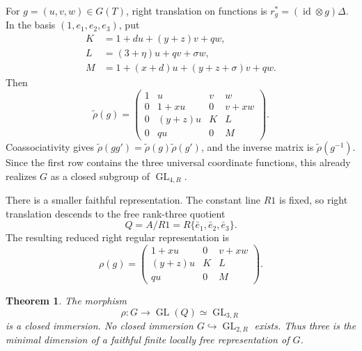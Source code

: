 \documentclass[11pt]{article}
\newtheorem{theorem}{Theorem}[section]
\theoremstyle{remark}
\newcommand{\GL}{\operatorname{GL}}
\newcommand{\id}{\operatorname{id}}
\begin{document}
For \(g=(u,v,w)\in G(T)\), right translation on functions is
\(r_g^*=(\id\otimes g)\Delta\).  In the basis
\((1,e_1,e_2,e_3)\), put
\begin{equation}\label{eq:KLM}
\begin{aligned}
 K&=1+du+(y+z)v+qw,\\
 L&=(3+\eta)u+qv+\sigma w,\\
 M&=1+(x+d)u+(y+z+\sigma)v+qw.
\end{aligned}
\end{equation}
Then
\begin{equation}\label{eq:GL4-matrix}
 \widetilde\rho(g)=
 \begin{pmatrix}
 1&u&v&w\\
 0&1+xu&0&v+xw\\
 0&(y+z)u&K&L\\
 0&qu&0&M
 \end{pmatrix}.
\end{equation}
Coassociativity gives
\(\widetilde\rho(gg')=\widetilde\rho(g)\widetilde\rho(g')\), and the
inverse matrix is \(\widetilde\rho(g^{-1})\).  Since the first row contains
the three universal coordinate functions, this already realizes \(G\) as a
closed subgroup of \(\GL_{4,R}\).

There is a smaller faithful representation.  The constant line \(R1\) is
fixed, so right translation descends to the free rank-three quotient
\begin{equation}\label{eq:reduced-regular}
 Q=A/R1=R\{\bar e_1,\bar e_2,\bar e_3\}.
\end{equation}
The resulting reduced right regular representation is
\begin{equation}\label{eq:GL3-matrix}
 \rho(g)=
 \begin{pmatrix}
 1+xu&0&v+xw\\
 (y+z)u&K&L\\
 qu&0&M
 \end{pmatrix}.
\end{equation}

\begin{theorem}\label{thm:GL3-minimal}
The morphism
\[
 \rho:G\longrightarrow\GL(Q)\simeq\GL_{3,R}
\]
is a closed immersion.  No closed immersion
\(G\hookrightarrow\GL_{2,R}\) exists.  Thus three is the minimal dimension
of a faithful finite locally free representation of \(G\).
\end{theorem}
\end{document}
